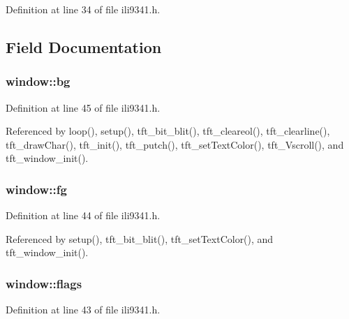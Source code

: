 Definition at line 34 of file ili9341.\+h.



\subsection{Field Documentation}
\subsubsection[{\texorpdfstring{bg}{bg}}]{ window\+::bg}\hypertarget{structwindow_affcf5d29153103c2537542f5a4f8ba87}{}\label{structwindow_affcf5d29153103c2537542f5a4f8ba87}


Definition at line 45 of file ili9341.\+h.



Referenced by loop(), setup(), tft\+\_\+bit\+\_\+blit(), tft\+\_\+cleareol(), tft\+\_\+clearline(), tft\+\_\+draw\+Char(), tft\+\_\+init(), tft\+\_\+putch(), tft\+\_\+set\+Text\+Color(), tft\+\_\+\+Vscroll(), and tft\+\_\+window\+\_\+init().

\subsubsection[{\texorpdfstring{fg}{fg}}]{ window\+::fg}\hypertarget{structwindow_ac8739cdb3c50efcc1deaa5ab955a5e62}{}\label{structwindow_ac8739cdb3c50efcc1deaa5ab955a5e62}


Definition at line 44 of file ili9341.\+h.



Referenced by setup(), tft\+\_\+bit\+\_\+blit(), tft\+\_\+set\+Text\+Color(), and tft\+\_\+window\+\_\+init().

\subsubsection[{\texorpdfstring{flags}{flags}}]{ window\+::flags}\hypertarget{structwindow_ad58fae853f87093ef4f0139df0a3f33d}{}\label{structwindow_ad58fae853f87093ef4f0139df0a3f33d}


Definition at line 43 of file ili9341.\+h.



